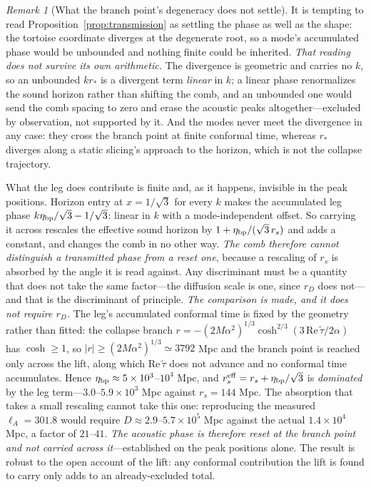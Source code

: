 \documentclass[11pt,a4paper]{article}
\theoremstyle{plain}
\theoremstyle{definition}
\theoremstyle{remark}
\newtheorem{remark}{Remark}
\begin{document}
\begin{remark}[What the branch point's degeneracy does not settle]\label{rem:phase-open}
It is tempting to read Proposition~\ref{prop:transmission} as settling the phase as well as the shape: the
tortoise coordinate diverges at the degenerate root, so a mode's accumulated phase would be unbounded and
nothing finite could be inherited. \emph{That reading does not survive its own arithmetic.} The divergence is
geometric and carries no $k$, so an unbounded $kr_{*}$ is a divergent term \emph{linear} in $k$; a linear phase
renormalizes the sound horizon rather than shifting the comb, and an unbounded one would send the comb spacing
to zero and erase the acoustic peaks altogether---excluded by observation, not supported by it. And the modes
never meet the divergence in any case: they cross the branch point at finite conformal time, whereas $r_{*}$ diverges
along a static slicing's approach to the horizon, which is not the collapse trajectory.

What the leg does contribute is finite and, as it happens, invisible in the peak positions. Horizon entry at
$x=1/\sqrt3$ for every $k$ makes the accumulated leg phase $k\eta_{\rm bp}/\sqrt3-1/\sqrt3$: linear in $k$ with
a mode-independent offset. So carrying it across rescales the effective sound horizon by
$1+\eta_{\rm bp}/(\sqrt3\,r_{s})$ and adds a constant, and changes the comb in no other way. \emph{The comb
therefore cannot distinguish a transmitted phase from a reset one}, because a rescaling of $r_{s}$ is absorbed by the angle it is read against. Any discriminant must be a quantity that does not take the same factor---the diffusion scale is one, since $r_{D}$ does not---and that is the discriminant of principle. \emph{The comparison is made, and it does not require $r_{D}$.} The leg's accumulated conformal time is fixed by the geometry rather than fitted: the collapse branch $r=-(2M\alpha^{2})^{1/3}\cosh^{2/3}(3\,\mathrm{Re}\,\tilde\tau/2\alpha)$ has $\cosh\ge1$, so $|r|\ge(2M\alpha^{2})^{1/3}\simeq3792$ Mpc and the branch point is reached only across the lift, along which $\mathrm{Re}\,\tilde\tau$ does not advance and no conformal time accumulates. Hence $\eta_{\rm bp}\approx5\times10^{3}$--$10^{4}$ Mpc, and $r_{s}^{\rm eff}=r_{s}+\eta_{\rm bp}/\sqrt3$ is \emph{dominated} by the leg term---$3.0$--$5.9\times10^{3}$ Mpc against $r_{s}=144$ Mpc. The absorption that takes a small rescaling cannot take this one: reproducing the measured $\ell_{A}=301.8$ would require $D\approx2.9$--$5.7\times10^{5}$ Mpc against the actual $1.4\times10^{4}$ Mpc, a factor of $21$--$41$. \emph{The acoustic phase is therefore reset at the branch point and not carried across it}---established on the peak positions alone. The result is robust to the open account of the lift: any conformal contribution the lift is found to carry only adds to an already-excluded total.
\end{remark}
\end{document}
